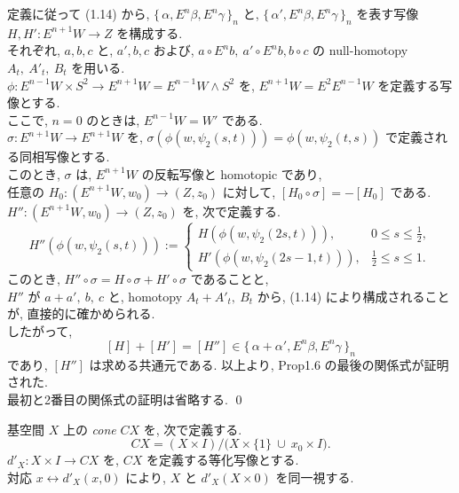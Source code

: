 \documentclass[12pt, leqno]{ltjsarticle}
\newcommand{\todai}[2][]{\{\,#2\,\}_{#1}}      %
\numberwithin{equation}{section}
\theoremstyle{plain}
\theoremstyle{definition}
\theoremstyle{remark}
\begin{document}
定義に従って (1.14) から,
\(\todai[n]{\alpha, E^n\beta, E^n\gamma}\) と,
\(\todai[n]{\alpha', E^n\beta, E^n\gamma}\) を表す写像\\ 
$H,H':E^{n+1}W\to Z$ を構成する.\\
それぞれ, $a,b,c$ と, $a',b,c$
および, \(a\circ E^n b,\ a'\circ E^n b, b\circ c\)
の null-homotopy $A_t,\ A'_t,\ B_t$ を用いる. \\
\(\phi: E^{n-1}W\times S^2\to E^{n+1}W = E^{n-1}W\wedge S^2\)
を, \(E^{n+1}W = E^2 E^{n-1}W\) を定義する写像とする.\\
ここで, \(n=0\) のときは, \(E^{n-1}W = W'\) である.\\
\(\sigma:E^{n+1}W\to E^{n+1}W\) を,
\(\sigma(\phi(w, \psi_2(s, t)))
= \phi(w, \psi_2(t, s))\)
で定義される同相写像とする.\\
このとき,
\(\sigma\) は,
\(E^{n+1}W\) の反転写像と homotopic であり,\\
任意の \(H_0:(E^{n+1}W,w_0)\to(Z,z_0)\) に対して,
\([H_0\circ\sigma] = -[H_0]\) である.\\
$H'':(E^{n+1}W,w_0)\to(Z,z_0)$ を, 次で定義する.
\[
H''(\phi(w,\psi_2(s, t))) :=
\begin{cases}
H(\phi(w, \psi_2(2s, t))), & 0\le s\le \tfrac12,\\
H'(\phi(w, \psi_2(2s-1, t))), & \tfrac12\le s\le 1.
\end{cases}
\]
このとき, 
\(H''\circ \sigma = 
H\circ \sigma + H'\circ \sigma\)
であることと,\\
\(H''\) が
\(a+a',\ b,\ c\) と, homotopy \(A_t + A'_t,\ B_t\) 
から, (1.14) により構成されることが, 直接的に確かめられる.\\
したがって,
\[
[H] + [H'] = [H''] \in 
\todai[n]{\alpha + \alpha', E^n\beta, E^n\gamma}
\]
であり, 
\([H'']\) は求める共通元である.
以上より,
Prop1.6 の最後の関係式が証明された.\\
最初と2番目の関係式の証明は省略する.
\qed


基空間 $X$ 上の \emph{cone} \(CX\) を, 次で定義する.
\[
CX=(X\times I)/\bigl(X\times\{1\}\ \cup\ x_0\times I\bigr).
\]
$d'_X:X\times I\to CX$ を, \(CX\) を定義する等化写像とする.\\
対応 $x\longleftrightarrow d'_X(x,0)$ により, 
$X$ と $d'_X(X\times {0})$ を同一視する. 
\end{document}
